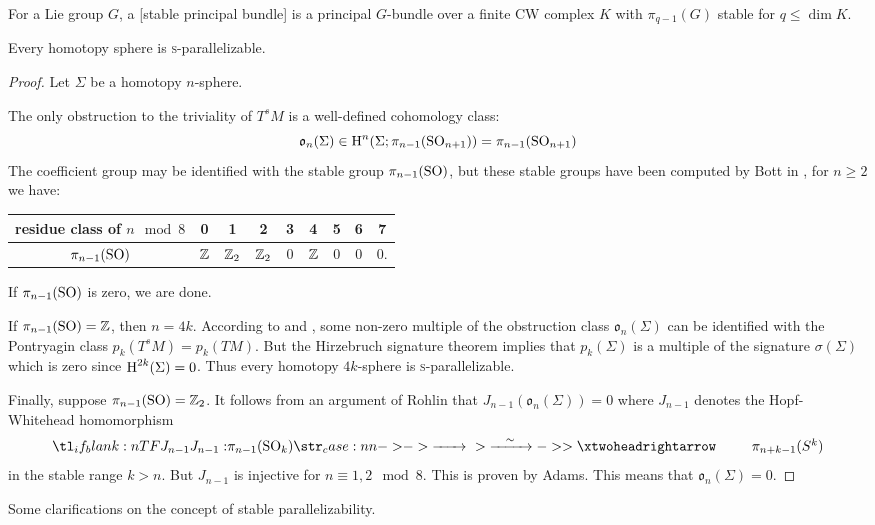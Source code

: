 \begin{definition}
	For a Lie group $G$, a [stable principal bundle] is a principal $G$-bundle over a finite CW complex $K$ with $\pi_{q-1}(G)$ stable for $q \leq \dim K$.
\end{definition}

\begin{theorem}
	Every homotopy sphere is \textsc{s}-parallelizable.
\end{theorem}

\begin{proof}
	Let $\Sigma$ be a homotopy $n$-sphere.

	The only obstruction to the triviality of $T^sM$ is a well-defined cohomology class:
	\[
		\mathfrak{o}_n(\Sigma) \in \operatorname{H}^n(\Sigma; \pi_{n-1}({\operatorname{SO}}_{n+1})) = \pi_{n-1}({\operatorname{SO}}_{n+1})
	\]
	The coefficient group may be identified with the stable group $\pi_{n-1}({\operatorname{SO}})$, but these stable groups have been computed by Bott in \cite{bott1957}, for $n\geq 2$ we have:
	\begin{center}
		\begin{tabular}{c|cccccccc}
			\textrm{residue class of $n\mod 8$} & 0 & 1 & 2 & 3 & 4 & 5 & 6 & 7\\
			\hline
			$\pi_{n-1}({\operatorname{SO}})$ & $\mathbb{Z}$ & $\mathbb{Z}_2$ & $\mathbb{Z}_2$ & 0 & $\mathbb{Z}$ & 0 & 0 & 0.
		\end{tabular}
	\end{center}
	If $\pi_{n-1}({\operatorname{SO}})$ is zero, we are done. 

	If $\pi_{n-1}({\operatorname{SO}}) = \mathbb{Z}$, then $n=4k$. According to \cite{kervairemilnor1960} and \cite{kervaire1959}, some non-zero multiple of the obstruction class $\mathfrak{o}_n(\Sigma)$ can be identified with the Pontryagin class $p_k(T^s M) = p_k(TM)$.  But the Hirzebruch signature theorem implies  that $p_k(\Sigma)$ is a multiple of the signature $\sigma(\Sigma)$ which is zero since $\operatorname{H}^{2k}(\Sigma)=0$. Thus every homotopy $4k$-sphere is \textsc{s}-parallelizable. 

	Finally, suppose $\pi_{n-1}({\operatorname{SO}})= \mathbb{Z}_2$. It follows from an argument of Rohlin  that $J_{n-1}(\mathfrak{o}_n(\Sigma))=0$ where $J_{n-1}$ denotes the Hopf-Whitehead homomorphism
	\[
		\lkxfunc{J_{n-1}}{\pi_{n-1}(\SO_k)}{\pi_{n+k-1}(S^k)}
	\]
	in the stable range $k >n$. But $J_{n-1}$ is injective for $n\equiv 1, 2\mod 8$. This is proven by Adams.  This means that $\mathfrak{o}_n(\Sigma)=0$.
\end{proof}

Some clarifications on the concept of stable parallelizability.

